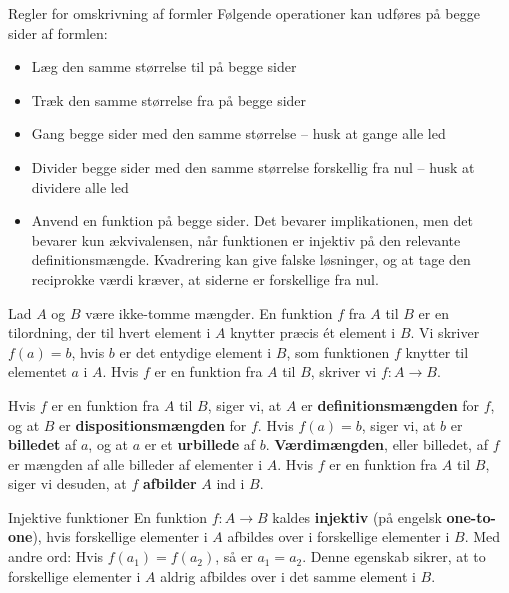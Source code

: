 \begin{custombox}{Regler for omskrivning af formler}
Følgende operationer kan udføres på begge sider af formlen:
\begin{itemize}
    \item Læg den samme størrelse til på begge sider
    \item Træk den samme størrelse fra på begge sider
    \item Gang begge sider med den samme størrelse -- husk at gange alle led
    \item Divider begge sider med den samme størrelse forskellig fra nul -- husk at dividere alle led
    \item Anvend en funktion på begge sider. Det bevarer implikationen, men det bevarer kun ækvivalensen, når funktionen er injektiv på den relevante definitionsmængde. Kvadrering kan give falske løsninger, og at tage den reciprokke værdi kræver, at siderne er forskellige fra nul.
\end{itemize}
\end{custombox}

\begin{definition}
Lad $A$ og $B$ være ikke-tomme mængder. En funktion $f$ fra $A$ til $B$ er en tilordning, der til hvert element i $A$ knytter præcis ét element i $B$. Vi skriver $f(a)=b$, hvis $b$ er det entydige element i $B$, som funktionen $f$ knytter til elementet $a$ i $A$. Hvis $f$ er en funktion fra $A$ til $B$, skriver vi $f: A \rightarrow B$.
\end{definition}

\begin{definition}
Hvis $f$ er en funktion fra $A$ til $B$, siger vi, at $A$ er \textbf{definitionsmængden} for $f$, og at $B$ er \textbf{dispositionsmængden} for $f$. Hvis $f(a)=b$, siger vi, at $b$ er \textbf{billedet} af $a$, og at $a$ er et \textbf{urbillede} af $b$. \textbf{Værdimængden}, eller billedet, af $f$ er mængden af alle billeder af elementer i $A$. Hvis $f$ er en funktion fra $A$ til $B$, siger vi desuden, at $f$ \textbf{afbilder} $A$ ind i $B$.    
\end{definition}

\begin{definition} {Injektive funktioner}
En funktion \( f: A \rightarrow B \) kaldes \textbf{injektiv} (på engelsk \textbf{one-to-one}), hvis forskellige elementer i \( A \) afbildes over i forskellige elementer i \( B \). Med andre ord: Hvis \( f(a_1) = f(a_2) \), så er \( a_1 = a_2 \). Denne egenskab sikrer, at to forskellige elementer i \( A \) aldrig afbildes over i det samme element i \( B \).     
\end{definition}

